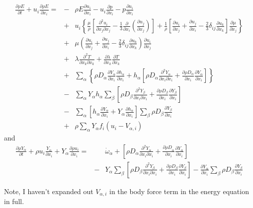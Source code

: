\documentclass[notitlepage]{revtex4-1}
\begin{document}
\begin{eqnarray}
\frac{\partial\rho{E}}{\partial{t}}+u_{i}\frac{\partial\rho{E}}{\partial{x}_{i}}=&-&\rho{E}\frac{\partial{u}_{i}}{\partial{x}_{i}}-u_{i}\frac{\partial{p}}{\partial{x}_{i}}-p\frac{\partial{u}_{i}}{\partial{x}_{i}}\\
&+&u_{i}\left\{\frac{\mu}{\rho}\left[\frac{\partial^{2}u_{i}}{\partial{x}_{j}\partial{x}_{j}}-\frac{1}{3}\frac{\partial}{\partial{x}_{i}}\left(\frac{\partial{u}_{j}}{\partial{x}_{j}}\right)\right]+\frac{1}{\rho}\left[\frac{\partial{u}_{i}}{\partial{x}_{j}}+\frac{\partial{u}_{j}}{\partial{x}_{i}}-\frac{2}{3}\delta_{ij}\frac{\partial{u}_{k}}{\partial{x}_{k}}\right]\frac{\partial\mu}{\partial{x}_{j}}\right\}\\
&+&\mu\left(\frac{\partial{u}_{i}}{\partial{x}_{j}}+\frac{\partial{u}_{j}}{\partial{x}_{i}}-\frac{2}{3}\delta_{ij}\frac{\partial{u}_{k}}{\partial{x}_{k}}\right)\frac{\partial{u}_{i}}{\partial{x}_{j}}\\
&+&\lambda\frac{\partial^{2}{T}}{\partial{x}_{k}\partial{x}_{k}}+\frac{\partial\lambda}{\partial{x}_{k}}\frac{\partial{T}}{\partial{x}_{k}}\\
&+&\displaystyle\sum_{\alpha}\left\{\rho{D}_{\alpha}\frac{\partial{Y}_{\alpha}}{\partial{x}_{i}}\frac{\partial{h}_{\alpha}}{\partial{x}_{i}}+{h}_{\alpha}\left[\rho{D}_{\alpha}\frac{\partial^{2}Y_{\alpha}}{\partial{x}_{i}\partial{x}_{i}}
+\frac{\partial\rho{D}_{\alpha}}{\partial{x}_{i}}\frac{\partial{Y}_{\alpha}}{\partial{x}_{i}}\right]\right\}\\
&-&\displaystyle\sum_{\alpha}{Y}_{\alpha}h_{\alpha}\displaystyle\sum_{\beta}\left[\rho{D}_{\beta}\frac{\partial^{2}{Y}_{\beta}}{\partial{x}_{i}\partial{x}_{i}}+\frac{\partial\rho{D}_{\beta}}{\partial{x}_{i}}\frac{\partial{Y}_{\beta}}{\partial{x}_{i}}\right]\\
&-&\displaystyle\sum_{\alpha}\left[h_{\alpha}\frac{\partial{Y}_{\alpha}}{\partial{x}_{i}}+Y_{\alpha}\frac{\partial{h}_{\alpha}}{\partial{x}_{i}}\right]\displaystyle\sum_{\beta}\rho{D}_{\beta}\frac{\partial{Y}_{\beta}}{\partial{x}_{i}}\\
&+&\rho\displaystyle\sum_{\alpha}Y_{\alpha}f_{i}\left({u}_{i}-V_{\alpha,i}\right)
\end{eqnarray}
and
\begin{eqnarray}
\frac{\partial\rho{Y}_{\alpha}}{\partial{t}}+\rho{u}_{i}\frac{{Y}_{\alpha}}{\partial{x}_{i}}+Y_{\alpha}\frac{\partial\rho{u}_{i}}{\partial{x}_{i}}=&&\dot\omega_{\alpha}
+\left[\rho{D}_{\alpha}\frac{\partial^{2}Y_{\alpha}}{\partial{x}_{i}\partial{x}_{i}}+\frac{\partial{\rho{D}}_{\alpha}}{\partial{x}_{i}}\frac{\partial{Y}_{\alpha}}{\partial{x}_{i}}\right]\\
&-&Y_{\alpha}\displaystyle\sum_{\beta}\left[\rho{D}_{\beta}\frac{\partial^{2}Y_{\beta}}{\partial{x}_{i}\partial{x}_{i}}+\frac{\partial\rho{D}_{\beta}}{\partial{x}_{i}}\frac{\partial{Y}_{\beta}}{\partial{x}_{i}}\right]-\frac{\partial{Y}_{\alpha}}{\partial{x}_{i}}\displaystyle\sum_{\beta}\rho{D}_{\beta}\frac{\partial{Y}_{\beta}}{\partial{x}_{i}}
\end{eqnarray}

Note, I haven't expanded out $V_{\alpha,i}$ in the body force term in the energy equation in full.





\end{document}
